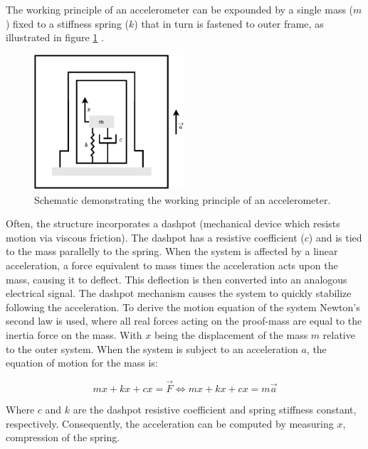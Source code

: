The working principle of an accelerometer can be expounded by a single mass ($m$) fixed to a stiffness spring ($k$) that in turn is fastened to outer frame, as illustrated in figure \ref{fig:accelerometer_schematic} \cite{roylance1979batch}.

\begin{figure}[!h]
    \centering
    \includegraphics[width=0.5\textwidth]{figures/accelerometer.pdf}
    \caption{Schematic demonstrating the working principle of an accelerometer. \cite{roylance1979batch} }
    \label{fig:accelerometer_schematic}
\end{figure}

Often, the structure incorporates a dashpot (mechanical device which resists motion via viscous friction). The dashpot has a resistive coefficient ($c$) and is tied to the mass parallelly to the spring. When the system is affected by a linear acceleration, a force equivalent to mass times the acceleration acts upon the mass, causing it to deflect. This deflection is then converted into an analogous electrical signal. The dashpot mechanism causes the system to quickly stabilize following the acceleration. To derive the motion equation of the system Newton's second law is used, where all real forces acting on the proof-mass are equal to the inertia force on the mass. With $x$ being the displacement of the mass $m$ relative to the outer system. When the system is subject to an acceleration $a$, the equation of motion for the mass is:

\begin{equation}
    mx + kx + cx = \overrightarrow{F}\Leftrightarrow mx + kx + cx = m\overrightarrow{a}
\end{equation}

Where $c$ and $k$ are the dashpot resistive coefficient and spring stiffness constant, respectively. Consequently, the acceleration can be computed by measuring $x$, compression of the spring.


